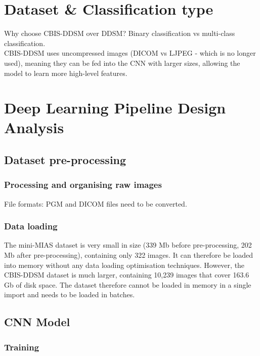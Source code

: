 \section{Dataset \& Classification type}

Why choose CBIS-DDSM over DDSM? Binary classification vs multi-class classification.\\

CBIS-DDSM uses uncompressed images (DICOM vs LJPEG - which is no longer used), meaning they can be fed into the CNN with larger sizes, allowing the model to learn more high-level features.

\section{Deep Learning Pipeline Design Analysis}

\subsection{Dataset pre-processing}

\subsubsection{Processing and organising raw images}

File formats: PGM and DICOM files need to be converted.

\subsubsection{Data loading}

The mini-MIAS dataset is very small in size (339 Mb before pre-processing, 202 Mb after pre-processing), containing only 322 images. It can therefore be loaded into memory without any data loading optimisation techniques. However, the CBIS-DDSM dataset is much larger, containing 10,239 images that cover 163.6 Gb of disk space. The dataset therefore cannot be loaded in memory in a single import and needs to be loaded in batches.\\ %

\subsection{CNN Model}

\subsubsection{Training}

